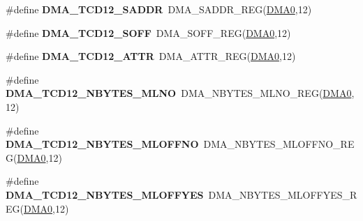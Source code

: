 \begin{DoxyCompactItemize}
\item 
\#define {\bfseries D\+M\+A\+\_\+\+T\+C\+D12\+\_\+\+S\+A\+D\+DR}~D\+M\+A\+\_\+\+S\+A\+D\+D\+R\+\_\+\+R\+EG(\hyperlink{group__DMA__Peripheral__Access__Layer_ga4103044f9ca209772f513dc694513ffb}{D\+M\+A0},12)\hypertarget{group__DMA__Register__Accessor__Macros_ga4dd8efb3586fceb233373ef3d8ed7eed}{}\label{group__DMA__Register__Accessor__Macros_ga4dd8efb3586fceb233373ef3d8ed7eed}

\item 
\#define {\bfseries D\+M\+A\+\_\+\+T\+C\+D12\+\_\+\+S\+O\+FF}~D\+M\+A\+\_\+\+S\+O\+F\+F\+\_\+\+R\+EG(\hyperlink{group__DMA__Peripheral__Access__Layer_ga4103044f9ca209772f513dc694513ffb}{D\+M\+A0},12)\hypertarget{group__DMA__Register__Accessor__Macros_ga011e8c68fffc17fe021a2642a0576241}{}\label{group__DMA__Register__Accessor__Macros_ga011e8c68fffc17fe021a2642a0576241}

\item 
\#define {\bfseries D\+M\+A\+\_\+\+T\+C\+D12\+\_\+\+A\+T\+TR}~D\+M\+A\+\_\+\+A\+T\+T\+R\+\_\+\+R\+EG(\hyperlink{group__DMA__Peripheral__Access__Layer_ga4103044f9ca209772f513dc694513ffb}{D\+M\+A0},12)\hypertarget{group__DMA__Register__Accessor__Macros_ga2a74898e8e99ad24eb0d62aa541d809b}{}\label{group__DMA__Register__Accessor__Macros_ga2a74898e8e99ad24eb0d62aa541d809b}

\item 
\#define {\bfseries D\+M\+A\+\_\+\+T\+C\+D12\+\_\+\+N\+B\+Y\+T\+E\+S\+\_\+\+M\+L\+NO}~D\+M\+A\+\_\+\+N\+B\+Y\+T\+E\+S\+\_\+\+M\+L\+N\+O\+\_\+\+R\+EG(\hyperlink{group__DMA__Peripheral__Access__Layer_ga4103044f9ca209772f513dc694513ffb}{D\+M\+A0},12)\hypertarget{group__DMA__Register__Accessor__Macros_ga693b26ec7160da096f6632d935bbeb63}{}\label{group__DMA__Register__Accessor__Macros_ga693b26ec7160da096f6632d935bbeb63}

\item 
\#define {\bfseries D\+M\+A\+\_\+\+T\+C\+D12\+\_\+\+N\+B\+Y\+T\+E\+S\+\_\+\+M\+L\+O\+F\+F\+NO}~D\+M\+A\+\_\+\+N\+B\+Y\+T\+E\+S\+\_\+\+M\+L\+O\+F\+F\+N\+O\+\_\+\+R\+EG(\hyperlink{group__DMA__Peripheral__Access__Layer_ga4103044f9ca209772f513dc694513ffb}{D\+M\+A0},12)\hypertarget{group__DMA__Register__Accessor__Macros_gab1a3b0c41ce17352024cb6352bbca988}{}\label{group__DMA__Register__Accessor__Macros_gab1a3b0c41ce17352024cb6352bbca988}

\item 
\#define {\bfseries D\+M\+A\+\_\+\+T\+C\+D12\+\_\+\+N\+B\+Y\+T\+E\+S\+\_\+\+M\+L\+O\+F\+F\+Y\+ES}~D\+M\+A\+\_\+\+N\+B\+Y\+T\+E\+S\+\_\+\+M\+L\+O\+F\+F\+Y\+E\+S\+\_\+\+R\+EG(\hyperlink{group__DMA__Peripheral__Access__Layer_ga4103044f9ca209772f513dc694513ffb}{D\+M\+A0},12)\hypertarget{group__DMA__Register__Accessor__Macros_gae26b659783dba451d178c3834746ebab}{}\label{group__DMA__Register__Accessor__Macros_gae26b659783dba451d178c3834746ebab}


\end{DoxyCompactItemize}
